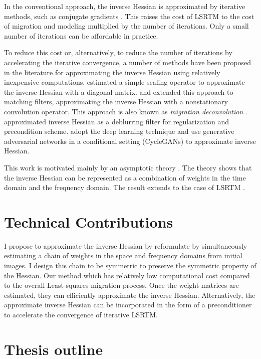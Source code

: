 In the conventional approach, the inverse Hessian is approximated by iterative methods, such as conjugate gradients \cite[]{tarantola,sun,xue}. This raises the cost of LSRTM to the cost of migration and modeling multiplied by the number of iterations. Only a small number of iterations can be affordable in practice. 

To reduce this cost or, alternatively, to reduce the number of iterations by accelerating the iterative convergence, a number of methods have been proposed in the literature for approximating the inverse Hessian using relatively inexpensive computations. \cite{rickett} estimated a simple scaling operator to approximate the inverse Hessian with a diagonal matrix. \cite{guitton} and \cite{greer} extended this approach to matching filters, approximating the inverse Hessian with a nonstationary convolution operator. This approach is also known as \emph{migration deconvolution} \cite[]{hu2001,yu2006}. \cite{aoki} approximated inverse Hessian as a deblurring filter for regularization and precondition scheme. \cite{kaur} adopt the deep learning technique and use generative adversarial networks in a conditional setting (CycleGANs) to approximate inverse Hessian.


This work is motivated mainly by an asymptotic theory \cite[]{miller1987,bleistein1987}. The theory shows that the inverse Hessian can be represented as a combination of weights in the time domain and the frequency domain. The result extends to the case of LSRTM \cite[]{hou15,hou16}. 

\section{Technical Contributions}

I propose to approximate the inverse Hessian by reformulate by simultaneously estimating a chain of weights in the space and frequency domains from initial images. I design this chain to be symmetric to preserve the symmetric property of the Hessian. Our method which has relatively low computational cost compared to the overall Least-squares migration process. Once the weight matrices are estimated, they can efficiently approximate the inverse Hessian. Alternatively, the approximate inverse Hessian can be incorporated in the form of a preconditioner to accelerate the convergence of iterative LSRTM.


\section{Thesis outline}

